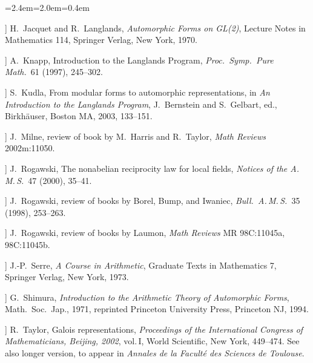 \begin{list}{}{\leftmargin=2.4em=2.0em=0.4em\itemsep=1.5pt}
\item[[JL]] H.\ Jacquet and R.\ Langlands, \emph{Automorphic Forms on GL(2)}, Lecture Notes in Mathematics 114, Springer Verlag, New York, 1970.
\item[[Kn]] A.\ Knapp, Introduction to the Langlands Program, \emph{Proc.\ Symp.\ Pure Math.}\ 61 (1997), 245--302.
\item[[K]] S.\ Kudla, From modular forms to automorphic representations, in \emph{An Introduction to the Langlands Program}, J.\ Bernstein and S.\ Gelbart, ed., Birkh\"auser, Boston MA, 2003, 133--151.
\item[[M]] J.\ Milne, review of book by M.\ Harris and R.\ Taylor, \emph{Math Reviews} 2002m:11050.
\item[[R1]] J.\ Rogawski, The nonabelian reciprocity law for local fields, \emph{Notices of the A.\,M.\,S.}\ 47 (2000), 35--41.
\item[[R2]] J.\ Rogawski, review of books by Borel, Bump, and Iwaniec, \emph{Bull.\ A.\,M.\,S.}\ 35 (1998), 253--263.
\item[[R3]] J.\ Rogawski, review of books by Laumon, \emph{Math Reviews} MR 98C:11045a, 98C:11045b.
\item[[Se]] J.-P.\ Serre, \emph{A Course in Arithmetic}, Graduate Texts in Mathematics 7, Springer Verlag, New York, 1973.
\item[[Sh1]] G.\ Shimura, \emph{Introduction to the Arithmetic Theory of Automorphic Forms}, Math.\ Soc.\ Jap., 1971, reprinted Princeton University Press, Princeton NJ, 1994.
\item[[T]] R.\ Taylor, Galois representations, \emph{Proceedings of the International Congress of Mathematicians, Beijing, 2002}, vol.\,I, World Scientific, New York, 449--474. See also longer version, to appear in \emph{Annales de la Facult\'e des Sciences de Toulouse}.
\end{list}
\endgroup
